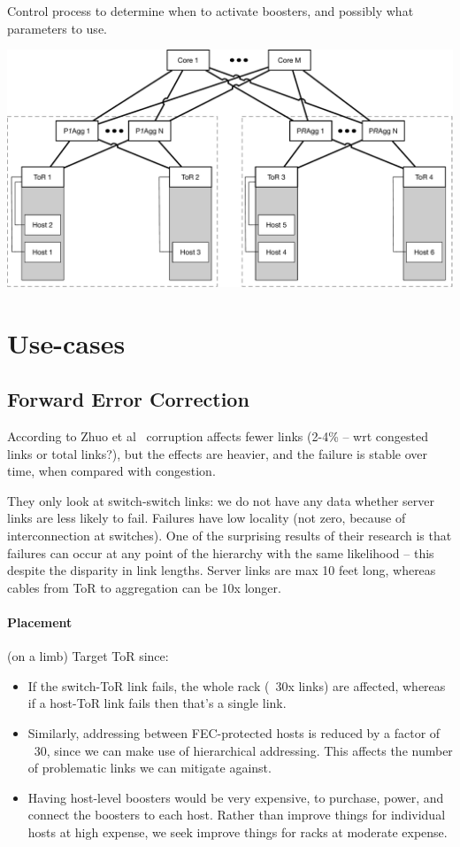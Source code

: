 \documentclass[sigconf]{acmart}
\begin{document}
Control process to determine when to activate boosters, and possibly what parameters to use.

\includegraphics[width=0.4\paperwidth]{topology.pdf}

\section{Use-cases}

\subsection{Forward Error Correction}

According to Zhuo et al~\cite{} corruption affects fewer links (2-4\% -- wrt congested links or total links?), but the effects are heavier, and the failure is stable over time, when compared with congestion.

They only look at switch-switch links: we do not have any data whether server
links are less likely to fail. Failures have low locality (not zero, because
of interconnection at switches). One of the surprising results of their
research is that failures can occur at any point of the hierarchy with the
same likelihood -- this despite the disparity in link lengths. Server links
are max 10 feet long, whereas cables from ToR to aggregation can be 10x
longer.

\paragraph{Placement} (on a limb) Target ToR since:
\begin{itemize}
  \item If the switch-ToR link fails, the whole rack (~30x links) are
    affected, whereas if a host-ToR link fails then that's a single link.
  \item Similarly, addressing between FEC-protected hosts is reduced by a
    factor of ~30, since we can make use of hierarchical addressing. This
    affects the number of problematic links we can mitigate against.
  \item Having host-level boosters would be very expensive, to purchase, power, and connect the boosters to each host. Rather than improve things for individual hosts at high expense, we seek improve things for racks at moderate expense.
\end{itemize}
\end{document}
